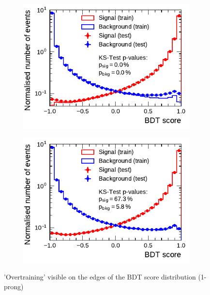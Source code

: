 \begin{figure}[ht]
  \begin{subfigure}[t]{0.48\textwidth}
    \centering
    \includegraphics{./figures/bdt_perf/scores/grid_1p0304.pdf}
  \end{subfigure}\hfill
  \begin{subfigure}[t]{0.48\textwidth}
    \centering
    \includegraphics{./figures/bdt_perf/scores/grid_1p_subsampling0269.pdf}
  \end{subfigure}
  \caption{'Overtraining' visible on the edges of the BDT score distribution
    (1-prong)}
  \label{fig:bdt_1p_scores}
\end{figure}

